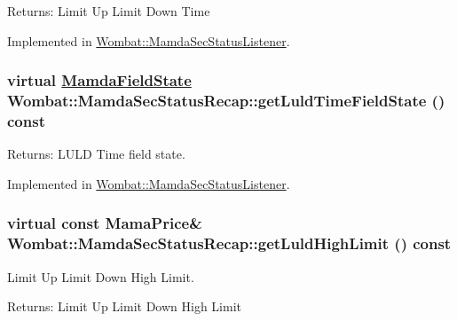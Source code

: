 \begin{Desc}
\item[Returns:]Limit Up Limit Down Time \end{Desc}


Implemented in \hyperlink{classWombat_1_1MamdaSecStatusListener_e682f4bbb0863a87fac4e03fa77156c0}{Wombat::Mamda\-Sec\-Status\-Listener}.\hypertarget{classWombat_1_1MamdaSecStatusRecap_db80d6bb0167935b3b622d6dde3a42bd}{
\subsubsection[getLuldTimeFieldState]{\setlength{\rightskip}{0pt plus 5cm}virtual \hyperlink{namespaceWombat_93aac974f2ab713554fd12a1fa3b7d2a}{Mamda\-Field\-State} Wombat::Mamda\-Sec\-Status\-Recap::get\-Luld\-Time\-Field\-State () const}}
\label{classWombat_1_1MamdaSecStatusRecap_db80d6bb0167935b3b622d6dde3a42bd}


\begin{Desc}
\item[Returns:]LULD Time field state. \end{Desc}


Implemented in \hyperlink{classWombat_1_1MamdaSecStatusListener_fa4c37602326edad8f06d582e7e843a0}{Wombat::Mamda\-Sec\-Status\-Listener}.\hypertarget{classWombat_1_1MamdaSecStatusRecap_832c6a65be3a072fb3980f27661f3fd5}{
\subsubsection[getLuldHighLimit]{\setlength{\rightskip}{0pt plus 5cm}virtual const Mama\-Price\& Wombat::Mamda\-Sec\-Status\-Recap::get\-Luld\-High\-Limit () const}}
\label{classWombat_1_1MamdaSecStatusRecap_832c6a65be3a072fb3980f27661f3fd5}


Limit Up Limit Down High Limit. 

\begin{Desc}
\item[Returns:]Limit Up Limit Down High Limit \end{Desc}


